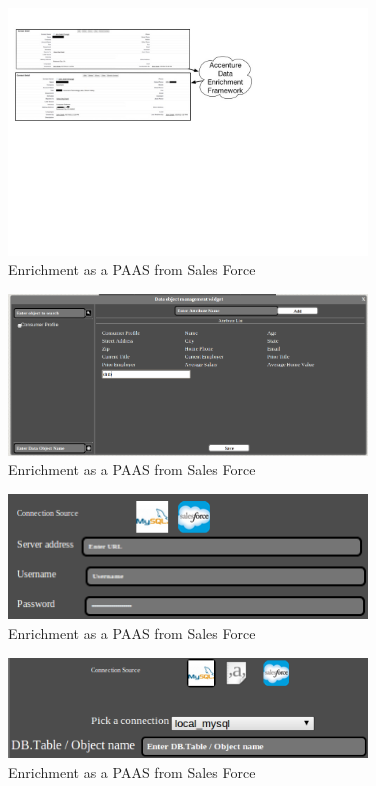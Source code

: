 \begin{figure}
\centering
\includegraphics[width=0.85\textwidth]{images/photo.jpg}
\caption{Enrichment as a PAAS from Sales Force}
\label{fig:salesforce}
\end{figure}


\begin{figure}
\centering
\includegraphics[width=0.85\textwidth]{images/dobadd.png}
\caption{Enrichment as a PAAS from Sales Force}
\label{fig:salesforce}
\end{figure}
\begin{figure}
\centering
\includegraphics[width=0.85\textwidth]{images/conn_add.png}
\caption{Enrichment as a PAAS from Sales Force}
\label{fig:salesforce}
\end{figure}
\begin{figure}
\centering
\includegraphics[width=0.85\textwidth]{images/setimport.png}
\caption{Enrichment as a PAAS from Sales Force}
\label{fig:salesforce}
\end{figure}
